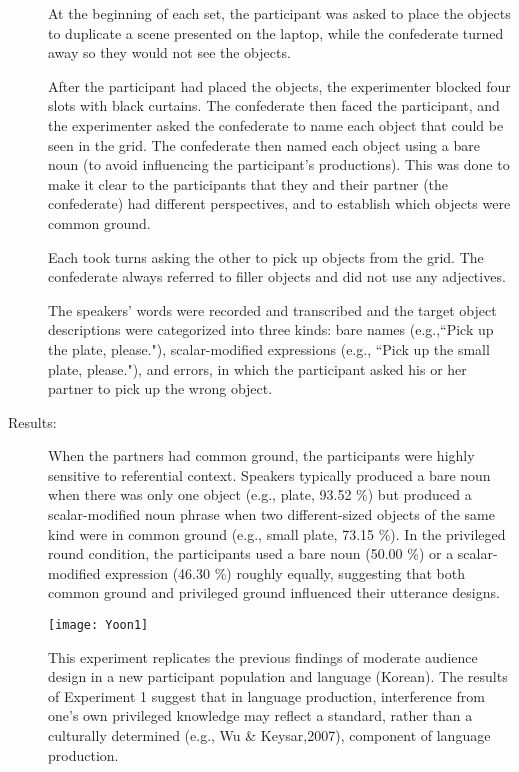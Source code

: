 \documentclass{article}
\begin{document}
\begin{multicols}{2}
\begin{description}
	At the beginning of each set, the participant was asked to place the objects to duplicate a scene presented on the laptop, while the confederate turned away so they would not see the objects.\\\vspace{4mm}
	
	After the participant had placed the objects, the experimenter blocked four slots with black curtains. The confederate then faced the participant, and the experimenter asked the confederate to name each object that could be seen in the grid. The confederate then named each object using a bare noun (to avoid influencing the participant's productions). This was done to make it clear to the participants that they and their partner (the confederate) had different perspectives, and to establish which objects were common ground.\\\vspace{4mm}
	
	Each took turns asking the other to pick up objects from the grid. The confederate always referred to filler objects and did not use any adjectives.\\\vspace{4mm}
	
	The speakers' words were recorded and transcribed and the target object descriptions were categorized into three kinds: bare names (e.g.,\textquotedblleft Pick up the plate, please."), scalar-modified expressions (e.g., \textquotedblleft Pick up the small plate, please."), and errors, in which the participant asked his or her partner to pick up the wrong object.
	\item[Results:]When the partners had common ground, the participants were highly sensitive to referential context. Speakers typically produced a bare noun when there was only one object (e.g., plate, 93.52 \%) but produced a scalar-modified noun phrase when two different-sized objects of the same kind were in common ground (e.g., small plate, 73.15 \%). In the privileged round condition, the participants used a bare noun (50.00 \%) or a scalar-modified expression (46.30 \%) roughly equally, suggesting that both common ground and privileged ground influenced their utterance designs.\\\vspace{3mm}
	
	\texttt{[image: Yoon1]}
	
	This experiment replicates the previous findings of moderate audience design in a new participant population and language (Korean). The results of Experiment 1 suggest that in language production, interference from one's own privileged knowledge may reflect a standard, rather than a culturally determined (e.g., Wu \& Keysar,2007), component of language production.
\end{description}

\end{multicols}
\end{document}

